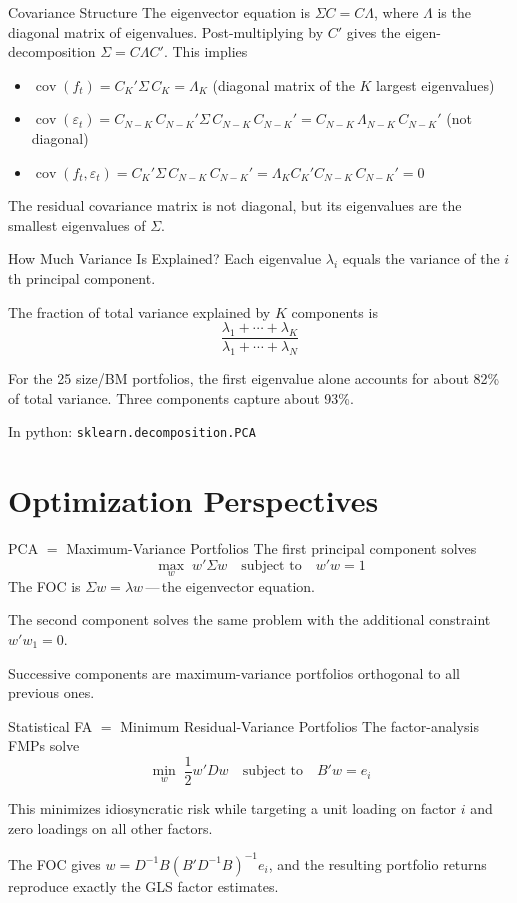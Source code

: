 \documentclass[10pt]{beamer}
\DeclareMathOperator{\cov}{cov}
\newcommand{\hlf}{\frac{1}{2}}
\newcommand{\bi}{\begin{itemize}}
\newcommand{\ei}{\end{itemize}}
\newcommand{\im}{\item}
\begin{document}
\begin{frame}{Covariance Structure}
The eigenvector equation is $\Sigma C = C\Lambda$, where $\Lambda$ is the diagonal matrix of eigenvalues.  Post-multiplying by $C'$ gives the eigen-decomposition $\Sigma = C\Lambda C'$.  This implies
\bi
\im $\cov(f_t) = C_K'\Sigma\, C_K = \Lambda_K$ \quad (diagonal matrix of the $K$ largest eigenvalues)
\im $\cov(\varepsilon_t) = C_{N-K}\,C_{N-K}'\Sigma\, C_{N-K}\,C_{N-K}' = C_{N-K}\,\Lambda_{N-K}\,C_{N-K}'$ \quad (\alert{not} diagonal)
\im $\cov(f_t, \varepsilon_t) = C_K'\Sigma\, C_{N-K}\,C_{N-K}' = \Lambda_K C_K'C_{N-K}\,C_{N-K}' = 0$
\ei
The residual covariance matrix is not diagonal, but its eigenvalues are the smallest eigenvalues of $\Sigma$.
\end{frame}

\begin{frame}{How Much Variance Is Explained?}
Each eigenvalue $\lambda_i$ equals the variance of the $i$th principal component.

The fraction of total variance explained by $K$ components is
$$\frac{\lambda_1 + \cdots + \lambda_K}{\lambda_1 + \cdots + \lambda_N}$$

For the 25 size/BM portfolios, the first eigenvalue alone accounts for about 82\% of total variance.  Three components capture about 93\%.

In python: \texttt{sklearn.decomposition.PCA}
\end{frame}


\section{Optimization Perspectives}

\begin{frame}{PCA $=$ Maximum-Variance Portfolios}
The first principal component solves
$$\max_{w}\; w'\Sigma w \quad \text{subject to}\quad w'w = 1$$
The FOC is $\Sigma w = \lambda w$\,---\,the eigenvector equation.

The second component solves the same problem with the additional constraint $w'w_1 = 0$.

Successive components are maximum-variance portfolios orthogonal to all previous ones.
\end{frame}

\begin{frame}{Statistical FA $=$ Minimum Residual-Variance Portfolios}
The factor-analysis FMPs solve
$$\min_{w}\; \hlf w'Dw \quad \text{subject to}\quad B'w = e_i$$

This minimizes idiosyncratic risk while targeting a unit loading on factor $i$ and zero loadings on all other factors.

The FOC gives $w = D^{-1}B(B'D^{-1}B)^{-1}e_i$, and the resulting portfolio returns reproduce exactly the GLS factor estimates.
\end{frame}
\end{document}
